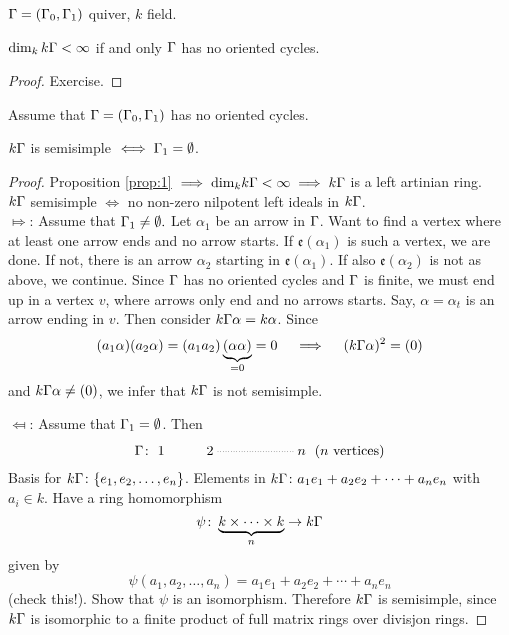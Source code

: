 \begin{prop}\label{prop:1}
  $\Gamma = (\Gamma_0,\Gamma_1)$ quiver, $k$ field.
\begin{center}
  $\dim_kk\Gamma < \infty$ if and only $\Gamma$ has no oriented cycles.
\end{center}
\end{prop}
\begin{proof}
  Exercise.
\end{proof}

\begin{prop}\label{prop:2}
Assume that $\Gamma=(\Gamma_0,\Gamma_1)$ has no oriented cycles. 
\begin{center}
$k\Gamma$ is semisimple $\iff \Gamma_1 = \emptyset$.
\end{center}
\end{prop}
\begin{proof}
  Proposition \ref{prop:1} $ \implies \text{dim}_kk\Gamma < \infty \implies k\Gamma$ is a left artinian ring. \\
  $k\Gamma$ semisimple $\iff $ no non-zero nilpotent left ideals in $k\Gamma$.\\

  $\Mapsto$: Assume that $\Gamma_1\neq\emptyset.$ Let $\alpha_1$ be an
  arrow in $\Gamma$. Want to find a vertex where at least one arrow ends
  and no arrow starts. If $\mathfrak{e}(\alpha_1)$ is such a vertex,
  we are done. If not, there is an arrow $\alpha_2$ starting in
  $\mathfrak{e}(\alpha_1)$.  If also $\mathfrak{e}(\alpha_2)$ is not
  as above, we continue. Since $\Gamma$ has no oriented cycles and $\Gamma$ is
  finite, we must end up in a vertex $ v$, where arrows only end and
  no arrows starts. Say, $\alpha = \alpha_t$ is an arrow ending in
  $v$. Then consider $k\Gamma\alpha = k\alpha$.  Since
  \[(a_1\alpha)(a_2\alpha) = (a_1a_2)\underbrace{(\alpha\alpha)}_{=0} =
  0\quad \implies \quad (k\Gamma\alpha)^2=(0)
\]
and $k\Gamma\alpha \neq (0)$, we infer that $k\Gamma$ is not semisimple.

$\Mapsfrom$: Assume that $\Gamma_1 = \emptyset$. Then 
\[\G\colon \xymatrix{1 & 2\ar@{..}[rr] & &  n} \text{ ($n$ vertices)}\]
  Basis for $k\Gamma\colon \{e_1, e_2, \ldots, e_n\}$. Elements in
  $k\Gamma\colon a_1e_1 + a_2e_2 + \cdots + a_ne_n$ with $a_i \in k$. Have
  a ring homomorphism
\[\psi\colon \underbrace{k \times \cdots \times k}_{n}  \rightarrow k\Gamma\]
  given by
\[\psi(a_1,a_2,\ldots,a_n)=a_1e_1 + a_2e_2+ \cdots + a_ne_n\] 
(check this!).  Show that $\psi$ is an isomorphism. Therefore $k\Gamma$ is
  semisimple, since $k\Gamma$ is isomorphic to a finite product of full
  matrix rings over divisjon rings.
\end{proof}

